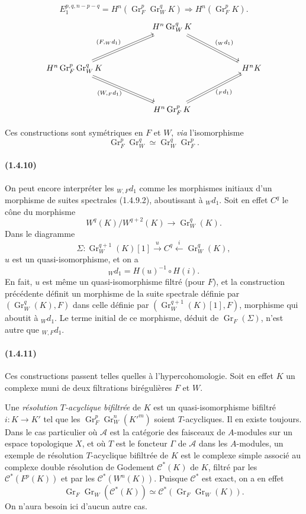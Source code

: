 \documentclass[10pt]{article}
\newcommand{\Gr}{\operatorname{Gr}}
\newcommand{\calA}{\mathcal A}
\begin{document}
\begin{enumerate}[label=\alph*)]
\[E_1^{p,q,n-p-q}=H^n(\Gr_F^p\Gr_W^qK)\Rightarrow H^n(\Gr_F^pK).
\]
\[
\begin{tikzcd}[column sep=5.2em,row sep=3.2em]
& H^n\Gr_W^qK
  \arrow[dr,shift left=1.2pt,"{\scriptstyle({}_Wd_1)}"]
  \arrow[dr,shift right=1.2pt,no head]
& \\
H^n\Gr_F^p\Gr_W^qK
  \arrow[ur,shift left=1.2pt,"{\scriptstyle(F,{}_Wd_1)}"]
  \arrow[ur,shift right=1.2pt,no head]
  \arrow[dr,shift left=1.2pt,"{\scriptstyle(W,{}_Fd_1)}"']
  \arrow[dr,shift right=1.2pt,no head]
&& H^nK \\
& H^n\Gr_F^pK
  \arrow[ur,shift left=1.2pt,"{\scriptstyle({}_Fd_1)}"']
  \arrow[ur,shift right=1.2pt,no head]
&
\end{tikzcd}
\]
\end{enumerate}
Ces constructions sont symétriques en $F$ et $W$, \emph{via} l'isomorphisme
\[
\Gr_F^p\Gr_W^q\simeq\Gr_W^q\Gr_F^p.
\]

\paragraph{(1.4.10)} On peut encore interpréter les ${}_{W,F}d_1$ comme les morphismes initiaux d'un morphisme de suites spectrales (1.4.9.2), aboutissant à ${}_Wd_1$. Soit en effet $C^q$ le cône du morphisme
\[
W^q(K)/W^{q+2}(K)\longrightarrow\Gr_W^q(K).
\]
Dans le diagramme
\[
\Sigma:\Gr_W^{q+1}(K)[1]\xrightarrow{u} C^q\xleftarrow{i}\Gr_W^q(K),
\]
$u$ est un quasi-isomorphisme, et on a
\[
{}_Wd_1=H(u)^{-1}\circ H(i).
\]
En fait, $u$ est même un quasi-isomorphisme filtré (pour $F$), et la construction précédente définit un morphisme de la suite spectrale définie par $(\Gr_W^q(K),F)$ dans celle définie par $(\Gr_W^{q+1}(K)[1],F)$, morphisme qui aboutit à ${}_Wd_1$. Le terme initial de ce morphisme, déduit de $\Gr_F(\Sigma)$, n'est autre que ${}_{W,F}d_1$.

\paragraph{(1.4.11)} Ces constructions passent telles quelles à l'hypercohomologie. Soit en effet $K$ un complexe muni de deux filtrations birégulières $F$ et $W$.

Une \emph{résolution $T$-acyclique bifiltrée} de $K$ est un quasi-isomorphisme bifiltré $i:K\to K'$ tel que les $\Gr_F^p\Gr_W^n(K'^m)$ soient $T$-acycliques. Il en existe toujours. Dans le cas particulier où $\calA$ est la catégorie des faisceaux de $A$-modules sur un espace topologique $X$, et où $T$ est le foncteur $\Gamma$ de $\calA$ dans les $A$-modules, un exemple de résolution $T$-acyclique bifiltrée de $K$ est le complexe simple associé au complexe double résolution de Godement $\mathcal C^*(K)$ de $K$, filtré par les $\mathcal C^*(F^p(K))$ et par les $\mathcal C^*(W^n(K))$. Puisque $\mathcal C^*$ est exact, on a en effet
\[
\Gr_F\Gr_W(\mathcal C^*(K))\simeq \mathcal C^*(\Gr_F\Gr_W(K)).
\]
On n'aura besoin ici d'aucun autre cas.
\end{document}
